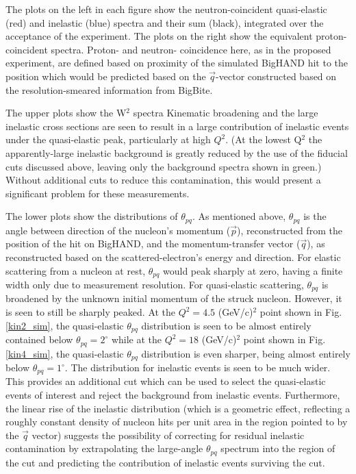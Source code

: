 \documentclass[12pt,letterpaper,oneside]{article}
\begin{document}
The plots on the left in each figure show the neutron-coincident
quasi-elastic (red) and inelastic (blue) spectra and their sum
(black), integrated over the acceptance of the experiment.
The plots
on the right show the equivalent proton-coincident spectra.  
Proton- and neutron- coincidence here, as in the proposed experiment,
are defined based on proximity of the simulated BigHAND hit to the
position which would be predicted based on the $\vec{q}$-vector
constructed based on the resolution-smeared information from BigBite.

The upper plots show the W$^2$ spectra   Kinematic
broadening and the large inelastic cross sections are seen to result
in a large contribution of inelastic events under the quasi-elastic
peak, particularly at high $Q^2$.  (At the lowest Q$^2$ the
apparently-large inelastic background is greatly reduced by the use of
the fiducial cuts discussed above, leaving only the background spectra
shown in green.)  Without additional cuts to reduce
this contamination, this would present a significant problem for these
measurements.

The lower plots show  the
distributions of $\theta_{pq}$.  As mentioned above, $\theta_{pq}$ is
the angle between direction of the nucleon's momentum ($\vec{p}$),
reconstructed from the position of the hit on BigHAND, and the 
momentum-transfer vector ($\vec{q}$), as reconstructed based on the
scattered-electron's energy and direction.  For elastic scattering
from a nucleon at rest, $\theta_{pq}$ would peak sharply at zero,
having a finite width only due to measurement resolution.  For
quasi-elastic scattering, $\theta_{pq}$ is broadened by
the unknown initial momentum of the struck nucleon.  However, it is
seen to still be sharply peaked.  At the $Q^2=4.5$ (GeV/c)$^2$ point
shown in Fig. \ref{kin2_sim}, the quasi-elastic $\theta_{pq}$
distribution is seen to be almost entirely contained below 
$\theta_{pq}=2^\circ$ while at the $Q^2=18$ (GeV/c)$^2$ point
shown in Fig. \ref{kin4_sim}, the quasi-elastic $\theta_{pq}$
distribution is even sharper, being almost entirely below
$\theta_{pq}=1^\circ$.  The distribution for inelastic events is seen
to be much wider. This provides an additional cut which can be used to
select the quasi-elastic events of interest and reject the background
from inelastic events.  Furthermore, the linear rise of the inelastic
distribution (which is a geometric effect, reflecting a roughly constant
density of nucleon hits per unit area in the region pointed to by the
$\vec{q}$ vector) suggests the possibility of correcting for residual
inelastic contamination by extrapolating the large-angle $\theta_{pq}$
spectrum into the region of the cut and predicting the contribution of 
inelastic events surviving the cut.
\end{document}
